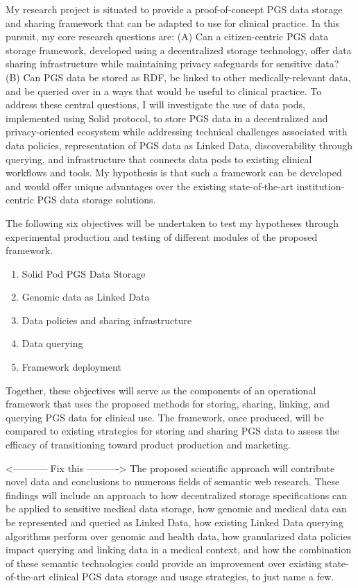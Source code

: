 \documentclass[runningheads]{llncs}
\begin{document}
My research project is situated to provide a proof-of-concept PGS data storage and sharing framework that can be adapted to use for clinical practice. 
In this pursuit, my core research questions are: 
(A) Can a citizen-centric PGS data storage framework, developed using a decentralized storage technology, offer data sharing infrastructure while maintaining privacy safeguards for sensitive data? 
(B) Can PGS data be stored as RDF, be linked to other medically-relevant data, and be queried over in a ways that would be useful to clinical practice.
To address these central questions, I will investigate the use of data pods, implemented using Solid protocol, to store PGS data in a decentralized and privacy-oriented ecosystem while addressing technical challenges associated with data policies, representation of PGS data as Linked Data, discoverability through querying, and infrastructure that connects data pods to existing clinical workflows and tools. 
My hypothesis is that such a framework can be developed and would offer unique advantages over the existing state-of-the-art institution-centric PGS data storage solutions. 

The following six objectives will be undertaken to test my hypotheses through experimental production and testing of different modules of the proposed framework.
\begin{enumerate}
    \item Solid Pod PGS Data Storage
    \item Genomic data as Linked Data
    \item Data policies and sharing infrastructure
    \item Data querying
    \item Framework deployment
\end{enumerate}

Together, these objectives will serve as the components of an operational framework that uses the proposed methods for storing, sharing, linking, and querying PGS data for clinical use. The framework, once produced, will be compared to existing strategies for storing and sharing PGS data to assess the efficacy of transitioning toward product production and marketing.

<----------- Fix this ---------->
The proposed scientific approach will contribute novel data and conclusions to numerous fields of semantic web research. 
These findings will include an approach to how decentralized storage specifications can be applied to sensitive medical data storage, how genomic and medical data can be represented and queried as Linked Data, how existing Linked Data querying algorithms perform over genomic and health data, how granularized data policies impact querying and linking data in a medical context, and how the combination of these semantic technologies could provide an improvement over existing state-of-the-art clinical PGS data storage and usage strategies, to just name a few.
\end{document}
